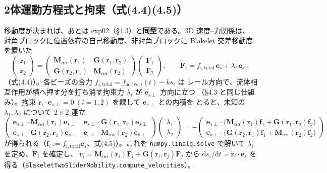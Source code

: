 \documentclass[11pt,a4paper]{article}
\newcommand{\es}{\bm{e}_{s}}
\newcommand{\esp}{\bm{e}_{s\perp}}
\newcommand{\rv}{\bm{r}}
\newcommand{\Fv}{\bm{F}}
\newcommand{\dd}{\mathrm{d}}
\begin{document}
\subsection{2体運動方程式と拘束（式(4.4)(4.5)）}

移動度が決まれば、あとは exp02（§4.3）と\textbf{同型}である。3D 速度--力関係は、
対角ブロックに位置依存の自己移動度、非対角ブロックに Blakelet 交差移動度を置いた
\begin{equation}
\begin{pmatrix}\dot{\rv}_1\\[2pt] \dot{\rv}_2\end{pmatrix}
=\begin{pmatrix}
\bm M_{\alpha\alpha}(\rv_1) & \bm G(\rv_1,\rv_2)\\[2pt]
\bm G(\rv_2,\rv_1) & \bm M_{\alpha\alpha}(\rv_2)
\end{pmatrix}
\begin{pmatrix}\Fv_1\\[2pt] \Fv_2\end{pmatrix},\qquad
\Fv_i=f_{i,\mathrm{total}}\,\es+\lambda_i\,\esp
\end{equation}
（式(4.4)）。各ビーズの合力 $f_{i,\mathrm{total}}=f_{\mathrm{active},i}(t)-k s_i$ は
レール方向で、流体相互作用が横へ押す分を打ち消す拘束力 $\lambda_i$ が $\esp$ 方向に立つ
（§4.3 と同じ仕組み）。拘束 $\dot{\rv}_i\cdot\esp=0\ (i=1,2)$ を課して $\esp$ との内積を
とると、未知の $\lambda_1,\lambda_2$ について $2\times2$ 連立
\begin{equation}
\begin{pmatrix}
\esp\!\cdot\!\bm M_{\alpha\alpha}(\rv_1)\esp & \esp\!\cdot\!\bm G(\rv_1,\rv_2)\esp\\[2pt]
\esp\!\cdot\!\bm G(\rv_2,\rv_1)\esp & \esp\!\cdot\!\bm M_{\alpha\alpha}(\rv_2)\esp
\end{pmatrix}
\!\begin{pmatrix}\lambda_1\\[2pt]\lambda_2\end{pmatrix}
=-\begin{pmatrix}
\esp\!\cdot\!\big(\bm M_{\alpha\alpha}(\rv_1)\bm f_1+\bm G(\rv_1,\rv_2)\bm f_2\big)\\[2pt]
\esp\!\cdot\!\big(\bm G(\rv_2,\rv_1)\bm f_1+\bm M_{\alpha\alpha}(\rv_2)\bm f_2\big)
\end{pmatrix}
\end{equation}
が得られる（$\bm f_i:=f_{i,\mathrm{total}}\es$、式(4.5)）。これを
\texttt{numpy.linalg.solve} で解いて $\lambda_i$ を定め、$\Fv_i$ を確定し、
$\dot{\rv}_i=\bm M_{\alpha\alpha}(\rv_i)\Fv_i+\bm G(\rv_i,\rv_j)\Fv_j$ から
$\dd s_i/\dd t=\dot{\rv}_i\cdot\es$ を得る（\texttt{BlakeletTwoSliderMobility.compute\_velocities}）。
\end{document}
